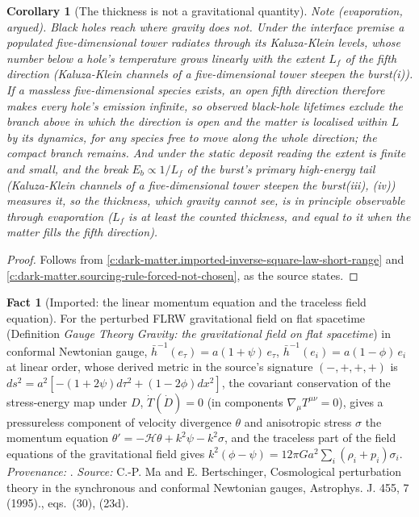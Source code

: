 \documentclass[11pt]{article}
\newtheorem{corollary}[theorem]{Corollary}
\theoremstyle{definition}
\newtheorem{fact}[theorem]{Fact}
\theoremstyle{plain}
\newcommand{\changedmark}[2]{\marginpar{\raggedright\scriptsize\color{#1}#2}}
\providecommand{\hb}{}\renewcommand{\hb}{\bar{h}}
\begin{document}
\begin{corollary}[The thickness is not a gravitational quantity]
\emph{Note (evaporation, argued).} Black holes reach where gravity does not. Under the interface premise a populated five-dimensional tower radiates through its Kaluza-Klein levels, whose number below a hole's temperature grows linearly with the extent $L_{f}$ of the fifth direction (\emph{Kaluza-Klein channels of a five-dimensional tower steepen the burst}(i)). If a massless five-dimensional species exists, an open fifth direction therefore makes every hole's emission infinite, so observed black-hole lifetimes exclude the branch above in which the direction is open and the matter is localised within $L$ by its dynamics, for any species free to move along the whole direction; the compact branch remains. And under the static deposit reading the extent is finite and small, and the break $E_{b} \propto 1/L_{f}$ of the burst's primary high-energy tail (\emph{Kaluza-Klein channels of a five-dimensional tower steepen the burst}(iii), (iv)) measures it, so the thickness, which gravity cannot see, is in principle observable through evaporation ($L_{f}$ is at least the counted thickness, and equal to it when the matter fills the fifth direction).
\end{corollary}
\begin{proof}
Follows from \ref{c:dark-matter.imported-inverse-square-law-short-range} and \ref{c:dark-matter.sourcing-rule-forced-not-chosen}, as the source states.

\end{proof}

\begin{fact}[Imported: the linear momentum equation and the traceless field equation]\label{c:dark-matter.imported-linear-momentum-equation-traceless-field}
\changedmark{BurntOrange}{changed since the deposit}
For the perturbed FLRW gravitational field on flat spacetime (Definition \emph{Gauge Theory Gravity: the gravitational field on flat spacetime}) in conformal Newtonian gauge, $\hb^{-1}(e_\tau) = a(1 + \psi)\,e_\tau$, $\hb^{-1}(e_i) = a(1 - \phi)\,e_i$ at linear order, whose derived metric in the source's signature $(-,+,+,+)$ is $ds^{2} = a^{2}[-(1 + 2\psi)d\tau^{2} + (1 - 2\phi)dx^{2}]$, the covariant conservation of the stress-energy map under $D$, $\dot T(\dot D) = 0$ (in components $\nabla_{\mu}T^{\mu\nu} = 0$), gives a pressureless component of velocity divergence $\theta$ and anisotropic stress $\sigma$ the momentum equation $\theta' = -\mathcal{H}\theta + k^{2}\psi - k^{2}\sigma$, and the traceless part of the field equations of the gravitational field gives $k^{2}(\phi - \psi) = 12\pi G a^{2}\sum_{i}(\rho_{i} + p_{i})\sigma_{i}$. \emph{Provenance:} \cite[eqs.~(30), (23d)]{MaBertschinger1995}.
\emph{Source:} C.-P. Ma and E. Bertschinger, Cosmological perturbation theory in the synchronous and conformal Newtonian gauges, Astrophys. J. 455, 7 (1995)., eqs.~(30), (23d).
\end{fact}
\end{document}
